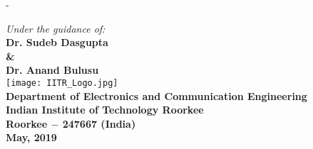 \begin{titlingpage}
\begin{SingleSpace}
\begin{adjustwidth*}{\unitlength}{-\unitlength}
\begin{center}
\vspace{0 mm}
{\large \textit{Under the guidance of:}}\\
\vspace{3 mm}
{\large\textbf{Dr. Sudeb Dasgupta\\ \& \\ Dr. Anand Bulusu}}\\%
\vspace{8 mm}
\texttt{[image: IITR\_Logo.jpg]}\\
\vspace{8 mm}
{\large \textbf{Department of Electronics and Communication Engineering}\\}
\vspace{1mm}
{\large \textbf{Indian Institute of Technology Roorkee}}\\
\vspace{1mm}
{\large \textbf{Roorkee $-$ 247667 (India)}}\\
\vspace{1mm}
{\large \textbf{May, 2019}}
\end{center}
\end{adjustwidth*}
\end{SingleSpace}
\end{titlingpage} 